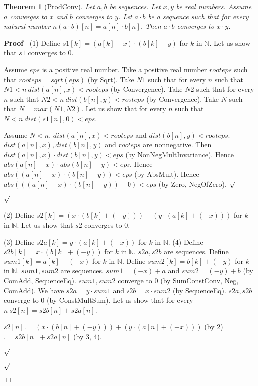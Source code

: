\documentclass{article}
\newenvironment{forthel}{\begin{leftbar}}{\end{leftbar}}
\newenvironment{proof}{\noindent\textbf{Proof\ }}{\hspace*{\fill}$\Box$\medskip}
\newenvironment{subproof}{\begin{list}{}{}
		\item[\text{Proof}]}{\hfill $\surd$ \end{list}}
\newtheorem{theorem}{Theorem}
\newcommand{\NN}{\mathbb{N}}
\newcommand{\cdotone}{\cdot}
\newcommand{\cdottwo}{\cdot}
\newcommand{\plustwo}{+}
\begin{document}
\begin{forthel}
	\begin{theorem}[ProdConv]
	Let $a,b$ be sequences. Let $x,y$ be real numbers. Assume $a$ converges to $x$ and $b$ converges to $y$.
	Let $a \cdotone b$ be a sequence such that for every natural number $n (a \cdotone b)[n] = a[n] \cdot b[n]$.
	Then $a \cdotone b$ converges to $x \cdot y$.
	\end{theorem}
	\begin{proof}
	(1) Define $s1[k] = (a[k] - x) \cdot (b[k] - y)$ for $k$ in $\NN$.
	Let us show that $s1$ converges to $0$. 
	\begin{subproof}
    Assume $eps$ is a positive real number. 
    Take a positive real number $rooteps$ such that $rooteps = sqrt(eps)$ (by Sqrt).
    Take $N1$ such that for every $n$ such that $N1 < n \ dist(a[n],x) < rooteps$ (by Convergence).
    Take $N2$ such that for every $n$ such that $N2 < n \ dist(b[n],y) < rooteps$ (by Convergence).
    Take $N$ such that $N = max(N1,N2)$.
    Let us show that for every $n$ such that $N < n \ dist(s1[n],0) < eps$.
    \begin{subproof}
    Assume $N < n$.
    $dist(a[n],x) < rooteps$ and $dist(b[n],y) < rooteps$.
    $dist(a[n],x), dist(b[n],y)$ and $rooteps$ are nonnegative.
    Then $dist(a[n],x) \cdot dist(b[n],y) < eps$ (by NonNegMultInvariance).
    Hence $abs(a[n] - x) \cdot abs(b[n] - y) < eps$.
    Hence $abs((a[n] - x) \cdot (b[n] - y)) < eps$ (by AbsMult).
    Hence $abs(((a[n] - x) \cdot (b[n] - y)) - 0) < eps$ (by Zero, NegOfZero).
    \end{subproof}
	\end{subproof}
	(2) Define $s2[k] = (x \cdot (b[k] + (-y))) + (y \cdot (a[k] + (-x)))$ for $k$ in $\NN$.
	Let us show that $s2$ converges to $0$.
	\begin{subproof}
	(3) Define $s2a[k] = y \cdot (a[k] + (-x))$ for $k$ in $\NN$.
	(4) Define $s2b[k] = x \cdot (b[k] + (-y))$ for $k$ in $\NN$.
	$s2a, s2b$ are sequences.
	Define $sum1[k] = a[k] + (-x)$ for $k$ in $\NN$.
	Define $sum2[k] = b[k] + (-y)$ for $k$ in $\NN$.
	$sum1, sum2$ are sequences.
	$sum1 = (-x) \plustwo a$ and $sum2 = (-y) \plustwo b$ (by ComAdd, SequenceEq).
	$sum1, sum2$ converge to $0$ (by SumConstConv, Neg, ComAdd).
	We have $s2a = y \cdottwo sum1$ and $s2b = x \cdottwo sum2$ (by SequenceEq).
	$s2a, s2b$ converge to $0$ (by ConstMultSum). 
	Let us show that for every $n \ s2[n] = s2b[n] + s2a[n]$.
	\begin{subproof}
	$s2[n] .= (x \cdot (b[n] + (-y))) + (y \cdot (a[n] + (-x)))$ (by 2)
	$.= s2b[n] + s2a[n]$ (by 3, 4).

\end{subproof}
\end{subproof}
\end{proof}
\end{forthel}
\end{document}
